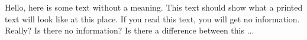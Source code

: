 \documentclass[15pt]{article}
\begin{document}
Hello,  here  is  some  text  without  a  meaning.   This  
text  should  show  what  a printed text will look like at 
this place.  If you read this text, you will get no information.  
Really?  Is there no information?  Is there a difference between 
this ...
\end{document}
